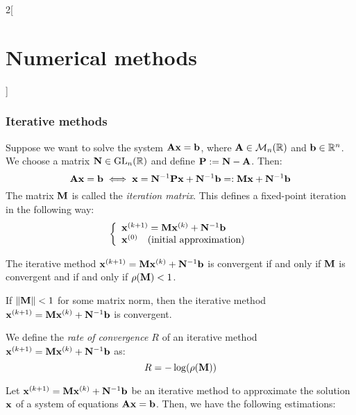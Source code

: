 \documentclass[../../../main.tex]{subfiles}
\begin{document}
\begin{multicols}{2}[\section{Numerical methods}]
\subsubsection*{Iterative methods}
\begin{definition}
    Suppose we want to solve the system $\vb{A}\vb{x}=\vb{b}$, where $\vb{A}\in\mathcal{M}_n(\mathbb{R})$ and $\vb{b}\in\mathbb{R}^n$. We choose a matrix $\vb{N}\in\mathrm{GL}_n(\mathbb{R})$ and define $\vb{P}:=\vb{N}-\vb{A}$. Then: $$\vb{A}\vb{x}=\vb{b}\iff \vb{x}=\vb{N}^{-1}\vb{P}\vb{x}+\vb{N}^{-1}\vb{b}=:\vb{M}\vb{x}+\vb{N}^{-1}\vb{b}$$ The matrix $\vb{M}$ is called the \textit{iteration matrix}. This defines a fixed-point iteration in the following way:
    \begin{equation*}
        \left\{
        \begin{array}{l}
            \vb{x}^{(k+1)}=\vb{M}\vb{x}^{(k)}+\vb{N}^{-1}\vb{b}\\
            \vb{x}^{(0)}\quad\text{(initial approximation)}
        \end{array}\right.
    \end{equation*}
\end{definition}
\begin{theorem}
    The iterative method $\vb{x}^{(k+1)}=\vb{M}\vb{x}^{(k)}+\vb{N}^{-1}\vb{b}$ is convergent if and only if $\vb{M}$ is convergent and if and only if $\rho(\vb{M})<1$.
\end{theorem}
\begin{corollary}
    If $\|\vb{M}\|<1$ for some matrix norm, then the iterative method $\vb{x}^{(k+1)}=\vb{M}\vb{x}^{(k)}+\vb{N}^{-1}\vb{b}$ is convergent.
\end{corollary}
\begin{definition}
    We define the \textit{rate of convergence $R$} of an iterative method $\vb{x}^{(k+1)}=\vb{M}\vb{x}^{(k)}+\vb{N}^{-1}\vb{b}$ as: $$R=-\log(\rho(\vb{M}))$$
\end{definition}
\begin{prop}
    Let $\vb{x}^{(k+1)}=\vb{M}\vb{x}^{(k)}+\vb{N}^{-1}\vb{b}$ be an iterative method to approximate the solution $\vb{x}$ of a system of equations $\vb{A}\vb{x}=\vb{b}$. Then, we have the following estimations:

\end{prop}
\end{multicols}
\end{document}
